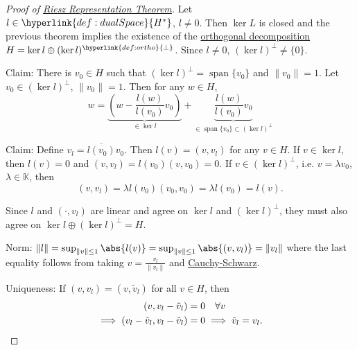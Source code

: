 \documentclass{article}
\newcommand{\K}{\mathbb{K}}
\DeclareMathOperator{\spn}{span}
\begin{document}
\begin{proof}[Proof of \hyperlink{def:riesz}{Riesz Representation Theorem}]
    Let $l \in \hyperlink{def:dualSpace}{H^*}$, $l \neq 0$.
    Then $\ker L$ is closed and the previous theorem implies the existence of the \hyperlink{def:ortho}{orthogonal decomposition} $H = \ker l \oplus (\ker l)^{\hyperlink{def:ortho}{\perp}}$.
    Since $l \neq 0$, $(\ker l)^\perp \neq \{0\}$.

    Claim: There is $v_0 \in H$ such that $(\ker l)^\perp = \spn \{v_0\}$ and $\|v_0\| = 1$.
    Let $v_0 \in (\ker l)^\perp$, $\|v_0\| = 1$. Then for any $w \in H$,
    \begin{equation*}
        w = \underbrace{\left(w - \frac{l(w)}{l(v_0)} v_0\right)}_{\in \ker l} + \underbrace{\frac{l(w)}{l(v_0)} v_0}_{\in \spn \{v_0\} \subset (\ker l)^\perp}
    \end{equation*}

    Claim: Define $v_l = \overline{l(v_0)} v_0$.
    Then $l(v) = (v, v_l)$ for any $v \in H$.
    If $v \in \ker l$, then $l(v) = 0$ and $(v, v_l) = l(v_0) (v,v_0) = 0$.
    If $v \in (\ker l)^\perp$, i.e. $v = \lambda v_0$, $\lambda \in \K$, then
    \begin{equation*}
        (v, v_l) = \lambda l(v_0) (v_0, v_0) = \lambda l(v_0) = l(v).
    \end{equation*}

    Since $l$ and $(\cdot, v_l)$ are linear and agree on $\ker l$ and $(\ker l)^\perp$, they must also agree on $\ker l \oplus (\ker l)^\perp = H$.

    Norm: $\|l\| = \sup_{\|v\| \leq 1} \abs{l(v)} = \sup_{\|v\| \leq 1} \abs{(v, v_l)} = \|v_l\|$
    where the last equality follows from taking $v = \frac{v_l}{\|v_l\|}$ and \hyperlink{thm:cs}{Cauchy-Schwarz}.

    Uniqueness: If $(v, v_l) = (v, \tilde{v}_l)$ for all $v \in H$, then
    \begin{align*}
        (v, v_l - \tilde{v}_l) &= 0 \quad \forall v \\
        \implies (v_l - \tilde{v}_l, v_l - \tilde{v}_l) &= 0 \implies \tilde{v}_l = v_l. \qedhere
    \end{align*}
\end{proof}

\end{document}
